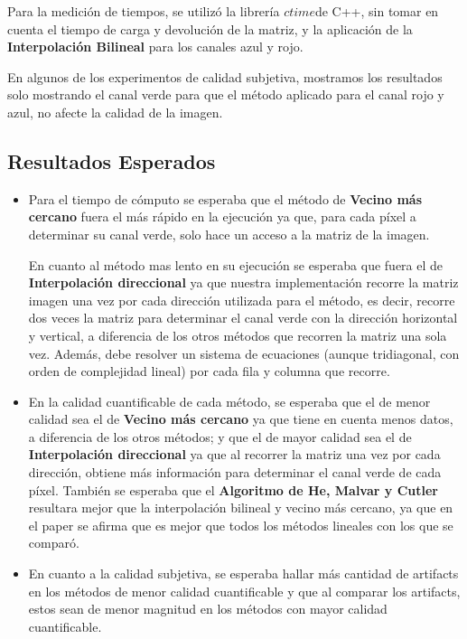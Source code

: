 \documentclass[a4paper]{article}
\begin{document}
Para la medición de tiempos, se utilizó la librería $ctime$de C++, sin tomar en cuenta el tiempo de carga y devolución de la matriz, y la aplicación de la \textbf{Interpolación Bilineal} para los canales azul y rojo.

En algunos de los experimentos de calidad subjetiva, mostramos los resultados solo mostrando el canal verde para que el método aplicado para el canal rojo y azul, no afecte la calidad de la imagen.

\subsection{Resultados Esperados}

\begin{itemize}
\item Para el tiempo de cómputo se esperaba que el método de \textbf{Vecino más cercano} fuera el más rápido en la ejecución ya que, para cada píxel a determinar su canal verde, solo hace un acceso a la matriz de la imagen. 

En cuanto al método mas lento en su ejecución se esperaba que fuera el de \textbf{Interpolación direccional} ya que nuestra implementación recorre la matriz imagen una vez por cada dirección utilizada para el método, es decir, recorre dos veces la matriz para determinar el canal verde con la dirección horizontal y vertical, a diferencia de los otros métodos que recorren la matriz una sola vez. Además, debe resolver un sistema de ecuaciones (aunque tridiagonal, con orden de complejidad lineal) por cada fila y columna que recorre.

\item En la calidad cuantificable de cada método, se esperaba que el de menor calidad sea el de \textbf{Vecino más cercano} ya que tiene en cuenta menos datos, a diferencia de los otros métodos; y que el de mayor calidad sea el de \textbf{Interpolación direccional} ya que al recorrer la matriz una vez por cada dirección, obtiene más información para determinar el canal verde de cada píxel. También se esperaba que el \textbf{Algoritmo de He, Malvar y Cutler} resultara mejor que la interpolación bilineal y vecino más cercano, ya que en el paper se afirma que es mejor que todos los métodos lineales con los que se comparó. 

\item En cuanto a la calidad subjetiva, se esperaba hallar más cantidad de artifacts en los métodos de menor calidad cuantificable y que al comparar los artifacts, estos sean de menor magnitud en los métodos con mayor calidad cuantificable.

\end{itemize}
\end{document}
